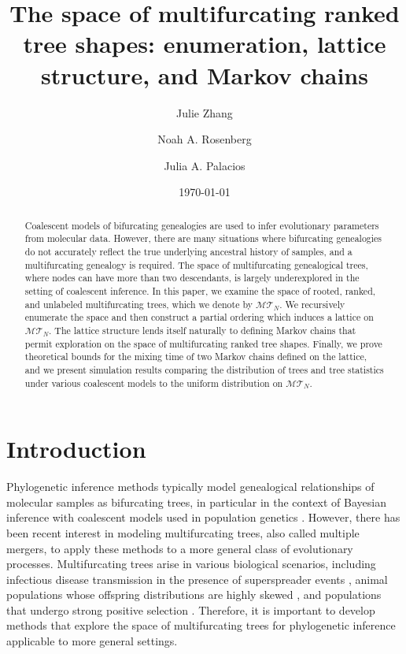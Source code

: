 \documentclass{article}
\title{The space of multifurcating ranked tree shapes: enumeration, lattice structure, and Markov chains}
\author[1]{Julie Zhang}
\author[2]{Noah A. Rosenberg}
\author[1,3]{Julia A. Palacios}
\date{\today} %
\affil[1]{Department of Statistics, Stanford University}
\affil[2]{Department of Biology, Stanford University}
\affil[3]{Department of Biomedical Data Science, Stanford University}
\begin{document}
\maketitle

\begin{abstract}
Coalescent models of bifurcating genealogies are used to infer evolutionary parameters from molecular data. However, there are many situations where bifurcating genealogies do not accurately reflect the true underlying ancestral history of samples, and a multifurcating genealogy is required. The space of multifurcating genealogical trees, where nodes can have more than two descendants, is largely underexplored in the setting of coalescent inference. In this paper, we examine the space of rooted, ranked, and unlabeled multifurcating trees, which we denote by $\mathcal{MT}_N$. We recursively enumerate the space and then construct a partial ordering which induces a lattice on $\mathcal{MT}_N$. The lattice structure lends itself naturally to defining Markov chains that permit exploration on the space of multifurcating ranked tree shapes. Finally, we prove theoretical bounds for the mixing time of two Markov chains defined on the lattice, and we present simulation results comparing the distribution of trees and tree statistics under various coalescent models to the uniform distribution on $\mathcal{MT}_N$. 
\end{abstract}


\section{Introduction}


Phylogenetic inference methods typically model genealogical relationships of molecular samples as bifurcating trees, in particular in the context of Bayesian inference with coalescent models used in population genetics \citep{Kingman1982}. However, there has been recent interest in modeling multifurcating trees, also called multiple mergers, to apply these methods to a more general class of evolutionary processes. Multifurcating trees arise in various biological scenarios, including infectious disease transmission in the presence of superspreader events \citep{li2017quantifying, menardo2021multiple}, animal populations whose offspring distributions are highly skewed \citep{sargsyan2008coalescent, niwa2016reproductive, eldon2018evolution, byeon2019origin, eldon2020evolutionary}, and populations that undergo strong positive selection \citep{der2012dynamics, eldon2023sweepstakes,arnason2023sweepstakes}. Therefore, it is important to develop methods that explore the space of multifurcating trees for phylogenetic inference applicable to more general settings.\\ 
\end{document}

